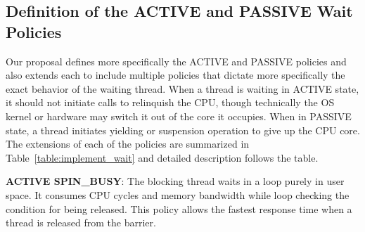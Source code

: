 \subsection{Definition of the ACTIVE and PASSIVE Wait Policies}
Our proposal defines more specifically 
the ACTIVE and PASSIVE policies and also extends each to include multiple policies that dictate more
specifically the exact behavior of the waiting thread. 
When a thread is waiting in ACTIVE state, it should not initiate calls to
relinquish the CPU, though technically the OS kernel or hardware may switch it out of the core it occupies. 
When in PASSIVE state, a thread initiates yielding or suspension operation to give up the CPU core. 
The extensions of each of the policies are summarized in Table~\ref{table:implement_wait} and detailed description
follows the table. 
\begin{table}[ht]
	\centering
{}
\label{table:implement_wait}
\caption{Wait Policies}
\end{table}

	{\bf ACTIVE SPIN\_BUSY}: The blocking thread waits in a loop purely in user space. 
		It consumes CPU cycles and memory bandwidth while loop checking
		the condition for being released. This policy allows the fastest response time when a thread is
		released from the barrier. 

